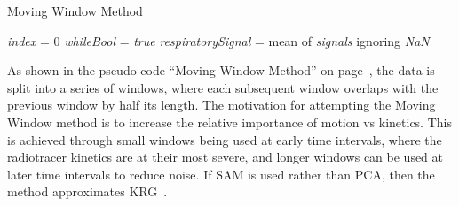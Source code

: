                 \begin{algorithm}
                    \caption{Moving Window Method}
                    \;
                    \textit{index} = $0$\;
                    \textit{whileBool} = \textit{true}\;
                    \;
                    \;
                    \textit{respiratorySignal} = mean of \textit{signals} ignoring \textit{NaN}\;
                    \;
                    
                    \label{alg:pca_data_driven_surrogate_signal_extraction_methods_for_dynamic_pet_methods_moving_window_pseudo_code}
                \end{algorithm}
                    
                As shown in the pseudo code ``Moving Window Method'' on page~\pageref{alg:pca_data_driven_surrogate_signal_extraction_methods_for_dynamic_pet_methods_moving_window_pseudo_code}, the data is split into a series of windows, where each subsequent window overlaps with the previous window by half its length. The motivation for attempting the Moving Window method is to increase the relative importance of motion vs kinetics. This is achieved through small windows being used at early time intervals, where the radiotracer kinetics are at their most severe, and longer windows can be used at later time intervals to reduce noise.  If \gls{SAM} is used rather than \gls{PCA},  then the method approximates \gls{KRG}~\parencite{Schleyer2014}.
                    
